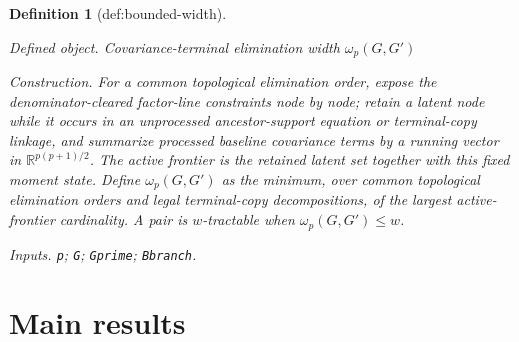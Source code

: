 \documentclass{article}
\newtheorem{definition}{Definition}
\begin{document}
\begin{definition}[def:bounded-width]\label{def:bounded-width}
\par\smallskip\noindent\emph{Defined object.} Covariance-terminal elimination width \(\omega_p(G,G')\)
\par\smallskip\noindent\emph{Construction.} For a common topological elimination order, expose the denominator-cleared factor-line constraints node by node; retain a latent node while it occurs in an unprocessed ancestor-support equation or terminal-copy linkage, and summarize processed baseline covariance terms by a running vector in \(\mathbb R^{p(p+1)/2}\). The active frontier is the retained latent set together with this fixed moment state. Define \(\omega_p(G,G')\) as the minimum, over common topological elimination orders and legal terminal-copy decompositions, of the largest active-frontier cardinality. A pair is \(w\)-tractable when \(\omega_p(G,G')\le w\).
\par\smallskip\noindent\emph{Inputs.} \texttt{p}; \texttt{G}; \texttt{Gprime}; \texttt{Bbranch}.
\end{definition}

\section{Main results}
\end{document}
